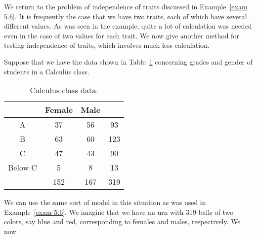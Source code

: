 We return to the problem of independence of traits discussed in
Example~\ref{exam 5.6}.  It is frequently the case that we have two traits, each of which have
several different values.  As was seen in the example, quite a lot of calculation was needed
even in the case of two values for each trait.  We now give another method for
testing independence of traits, which involves much less calculation.
\begin{example}\label{exam 5.20}
Suppose that we have the data shown in Table~\ref{table 5.7} concerning grades and gender of
students in a Calculus class.
\begin{table}
\centering
\begin{tabular}{|c|c|c|c|}
\hline
       &Female\hspace{.15in}&\hspace{.15in}Male\hspace{.15in}& \\ \hline 
A      & \hspace{.15in}37  & \hspace{.15in}56                &\hspace{.15in}93  \\ \hline 
B      & \hspace{.15in}63  & \hspace{.15in}60                &\hspace{.075in}123\\ \hline 
C      & \hspace{.15in}47  & \hspace{.15in}43                &\hspace{.15in}90  \\ \hline 
Below C& \hspace{.25in}5   & \hspace{.25in}8                 &\hspace{.15in}13  \\ \hline 
       &\hspace{.1in}152   &\hspace{.1in}167                 &\hspace{.075in}319\\ \hline
\end{tabular}
\caption{Calculus class data.}
\label{table 5.7}
\end{table}
We can use the same sort of model in this situation as was used in Example~\ref{exam
5.6}.  We imagine that we have an urn with 319 balls of two colors, say blue and
red, corresponding to females and males, respectively.  We now

\end{example}
